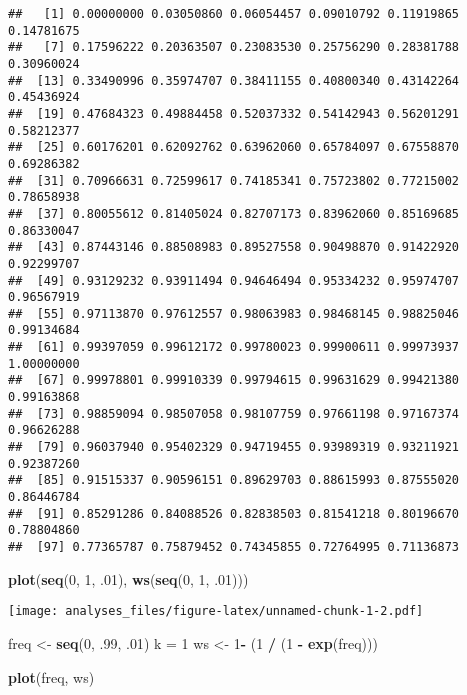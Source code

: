 \documentclass[]{article}
\newenvironment{Shaded}{\begin{snugshade}}{\end{snugshade}}
\newcommand{\KeywordTok}[1]{\textcolor[rgb]{0.13,0.29,0.53}{\textbf{#1}}}
\newcommand{\DecValTok}[1]{\textcolor[rgb]{0.00,0.00,0.81}{#1}}
\newcommand{\StringTok}[1]{\textcolor[rgb]{0.31,0.60,0.02}{#1}}
\newcommand{\OperatorTok}[1]{\textcolor[rgb]{0.81,0.36,0.00}{\textbf{#1}}}
\newcommand{\NormalTok}[1]{#1}
\begin{document}
\begin{verbatim}
##   [1] 0.00000000 0.03050860 0.06054457 0.09010792 0.11919865 0.14781675
##   [7] 0.17596222 0.20363507 0.23083530 0.25756290 0.28381788 0.30960024
##  [13] 0.33490996 0.35974707 0.38411155 0.40800340 0.43142264 0.45436924
##  [19] 0.47684323 0.49884458 0.52037332 0.54142943 0.56201291 0.58212377
##  [25] 0.60176201 0.62092762 0.63962060 0.65784097 0.67558870 0.69286382
##  [31] 0.70966631 0.72599617 0.74185341 0.75723802 0.77215002 0.78658938
##  [37] 0.80055612 0.81405024 0.82707173 0.83962060 0.85169685 0.86330047
##  [43] 0.87443146 0.88508983 0.89527558 0.90498870 0.91422920 0.92299707
##  [49] 0.93129232 0.93911494 0.94646494 0.95334232 0.95974707 0.96567919
##  [55] 0.97113870 0.97612557 0.98063983 0.98468145 0.98825046 0.99134684
##  [61] 0.99397059 0.99612172 0.99780023 0.99900611 0.99973937 1.00000000
##  [67] 0.99978801 0.99910339 0.99794615 0.99631629 0.99421380 0.99163868
##  [73] 0.98859094 0.98507058 0.98107759 0.97661198 0.97167374 0.96626288
##  [79] 0.96037940 0.95402329 0.94719455 0.93989319 0.93211921 0.92387260
##  [85] 0.91515337 0.90596151 0.89629703 0.88615993 0.87555020 0.86446784
##  [91] 0.85291286 0.84088526 0.82838503 0.81541218 0.80196670 0.78804860
##  [97] 0.77365787 0.75879452 0.74345855 0.72764995 0.71136873
\end{verbatim}

\begin{Shaded}
\begin{Highlighting}[]
\KeywordTok{plot}\NormalTok{(}\KeywordTok{seq}\NormalTok{(}\DecValTok{0}\NormalTok{, }\DecValTok{1}\NormalTok{, .}\DecValTok{01}\NormalTok{), }\KeywordTok{ws}\NormalTok{(}\KeywordTok{seq}\NormalTok{(}\DecValTok{0}\NormalTok{, }\DecValTok{1}\NormalTok{, .}\DecValTok{01}\NormalTok{)))}
\end{Highlighting}
\end{Shaded}

\texttt{[image: analyses\_files/figure-latex/unnamed-chunk-1-2.pdf]}

\begin{Shaded}
\begin{Highlighting}[]
\NormalTok{freq <-}\StringTok{ }\KeywordTok{seq}\NormalTok{(}\DecValTok{0}\NormalTok{, .}\DecValTok{99}\NormalTok{, .}\DecValTok{01}\NormalTok{)}
\NormalTok{k =}\StringTok{ }\DecValTok{1}
\NormalTok{ws <-}\StringTok{ }\DecValTok{1}\OperatorTok{-}\StringTok{ }\NormalTok{(}\DecValTok{1} \OperatorTok{/}\StringTok{ }\NormalTok{(}\DecValTok{1} \OperatorTok{-}\StringTok{ }\KeywordTok{exp}\NormalTok{(freq)))}

\KeywordTok{plot}\NormalTok{(freq, ws)}
\end{Highlighting}
\end{Shaded}
\end{document}
